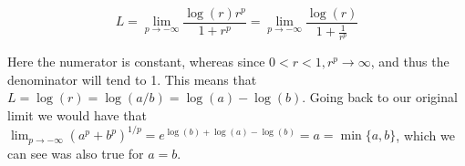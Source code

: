 \begin{solution}
    $$L = \lim_{p \rightarrow -\infty} \frac{\log(r)r^p}{1 + r^p} = \lim_{p \rightarrow -\infty} \frac{\log(r)}{1 + \frac{1}{r^p}}$$

    Here the numerator is constant, whereas since $0 < r < 1, r^p \rightarrow \infty$, and thus the denominator will tend to 1.
    This means that $L = \log(r) = \log(a/b) = \log(a) - \log(b)$.
    Going back to our original limit we would have that $\lim_{p \rightarrow -\infty}(a^p + b^p)^{1/p} = e^{\log(b) + \log(a) - \log(b)} = a = \min\{a, b\}$, which we can see was also true for $a = b$.
\end{solution}